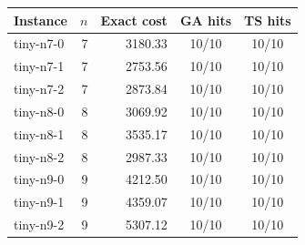 \begin{tabular}{@{}lrrcc@{}}
\toprule
Instance & $n$ & Exact cost & GA hits & TS hits \\
\midrule
tiny-n7-0 & 7 & 3180.33 & 10/10 & 10/10 \\
tiny-n7-1 & 7 & 2753.56 & 10/10 & 10/10 \\
tiny-n7-2 & 7 & 2873.84 & 10/10 & 10/10 \\
tiny-n8-0 & 8 & 3069.92 & 10/10 & 10/10 \\
tiny-n8-1 & 8 & 3535.17 & 10/10 & 10/10 \\
tiny-n8-2 & 8 & 2987.33 & 10/10 & 10/10 \\
tiny-n9-0 & 9 & 4212.50 & 10/10 & 10/10 \\
tiny-n9-1 & 9 & 4359.07 & 10/10 & 10/10 \\
tiny-n9-2 & 9 & 5307.12 & 10/10 & 10/10 \\
\bottomrule
\end{tabular}
